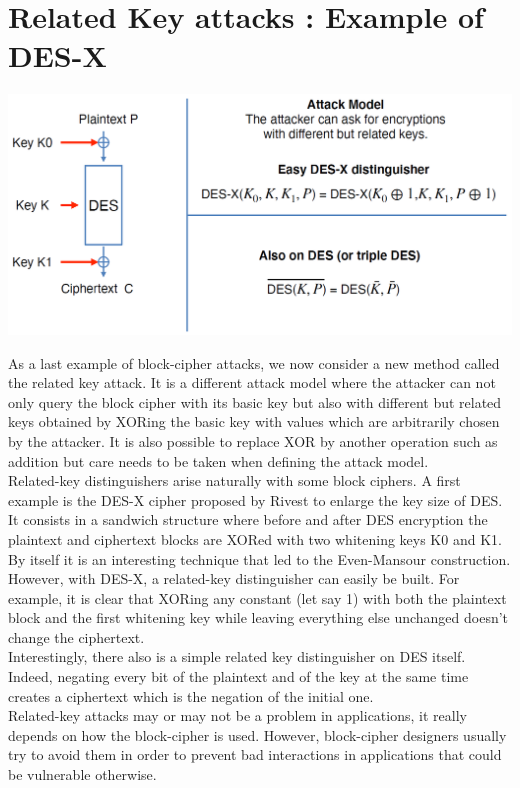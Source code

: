 \section{Related Key attacks : Example of DES-X}
	\begin{center}
		\includegraphics[width=140mm]{Graphics/Cryptanalysis/c8.png}
	\end{center}
	As a last example of block-cipher attacks, we now consider a new method called the related key attack. 
	It is a different attack model where the attacker can not only query the block cipher with its basic key but also with different but related keys obtained by XORing 
	the basic key with values which are arbitrarily chosen by the attacker. 
	It is also possible to replace XOR by another operation such as addition but care needs to be taken when defining the attack model.\\
	Related-key distinguishers arise naturally with some block ciphers. 
	A first example is the DES-X cipher proposed by Rivest to enlarge the key size of DES. 
	It consists in a sandwich structure where before and after DES encryption the plaintext and ciphertext blocks are XORed with two whitening keys K0 and K1.
	By itself it is an interesting technique that led to the Even-Mansour construction. 
	However, with DES-X, a related-key distinguisher can easily be built. 
	For example, it is clear that XORing any constant (let say 1) with both the plaintext block and the first whitening key while leaving everything else unchanged doesn’t change the ciphertext.\\
	Interestingly, there also is a simple related key distinguisher on DES itself. 
	Indeed, negating every bit of the plaintext and of the key at the same time creates a ciphertext which is the negation of the initial one.\\
	Related-key attacks may or may not be a problem in applications, it really depends on how the block-cipher is used. 
	However, block-cipher designers usually try to avoid them in order to prevent bad interactions in applications that could be vulnerable otherwise.

